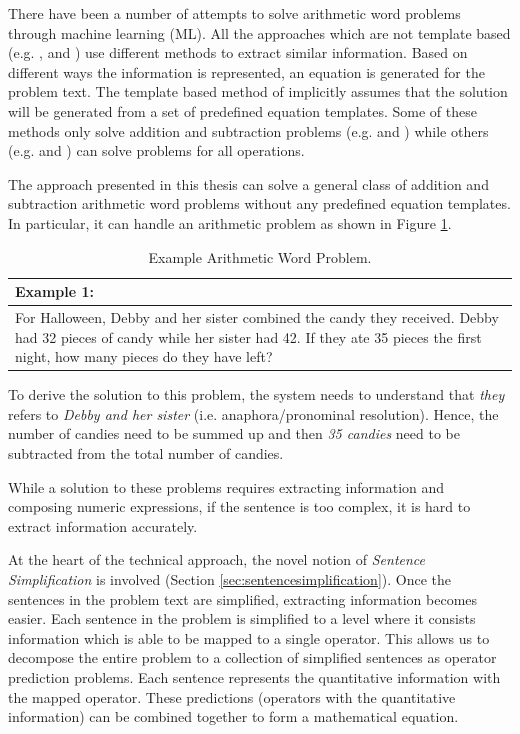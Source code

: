 \documentclass[11pt]{article}
\begin{document}
There have been a number of attempts to solve arithmetic word problems through machine learning (ML). 
All the approaches which are not template based (e.g. \citep{ARIS}, \citep{RoyTACL15} and \citep{RoyR15}) use different methods to extract similar information. Based on different ways the information is represented, an equation is generated for the problem text. The template based method of \citep{Kushman} implicitly assumes that the solution will be generated from a set of predefined equation templates. Some of these methods only solve addition and subtraction problems (e.g. \citep{ARIS} and \citep{RoyTACL15}) while others (e.g. \citep{RoyR15} and \citep{Kushman}) can solve problems for all operations.

The approach presented in this thesis can solve a general class of addition and subtraction arithmetic word problems without any predefined equation templates. In particular, it can handle an arithmetic problem as shown in Figure \ref{figure:1}.

\begin{table}[h!]
\centering
\begin{tabular}{ | m{25em} | }
\hline
\textbf{Example 1:}\\
\hline
For Halloween, Debby and her sister combined the candy they received. Debby had 32 pieces of candy while her sister had 42. If they ate 35 pieces the first night, how many pieces do they have left?\\
\hline
\end{tabular}
\caption{Example Arithmetic Word Problem.}
\label{figure:1}
\end{table}

To derive the solution to this problem, the system needs to understand that \textit{they} refers to \textit{Debby and her sister} (i.e. anaphora/pronominal resolution). Hence, the number of candies need to be summed up and then \textit{35 candies} need to be subtracted from the total number of candies. 

While a solution to these problems requires extracting information and composing numeric expressions, if the sentence is too complex, it is hard to extract information accurately.

At the heart of the technical approach, the novel notion of \textit{Sentence Simplification} is involved (Section \ref{sec:sentencesimplification}). Once the sentences in the problem text are simplified, extracting information becomes easier. Each sentence in the problem is simplified to a level where it consists information which is able to be mapped to a single operator. This allows us to decompose the entire problem to a collection of simplified sentences as operator prediction problems. Each sentence represents the quantitative information with the mapped operator. These predictions (operators with the quantitative information) can be combined together to form a mathematical equation.
\end{document}
